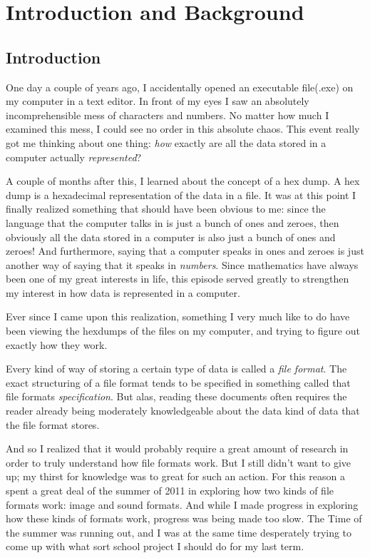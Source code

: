 \begin{comment}
  
\end{comment}

\chapter{Introduction and Background}

\section{Introduction}

One day a couple of years ago, I accidentally opened an executable
file(.exe) on my computer in a text editor. In front of my eyes I saw
an absolutely incomprehensible mess of characters and numbers. No
matter how much I examined this mess, I could see no order in this
absolute chaos. This event really got me thinking about one thing:
\textit{how} exactly are all the data stored in a computer actually
\textit{represented}?

A couple of months after this, I learned about the concept of a hex
dump. A hex dump is a hexadecimal representation of the data in a
file. It was at this point I finally realized something that should
have been obvious to me: since the language that the computer talks in
is just a bunch of ones and zeroes, then obviously all the data stored
in a computer is also just a bunch of ones and zeroes! And
furthermore, saying that a computer speaks in ones and zeroes is just
another way of saying that it speaks in \textit{numbers}. Since
mathematics have always been one of my great interests in life, this
episode served greatly to strengthen my interest in how data is
represented in a computer.

Ever since I came upon this realization, something I very much like to
do have been viewing the hexdumps of the files on my computer, and
trying to figure out exactly how they work. %

Every kind of way of storing a certain type of data is called a
\textit{file format}. The exact structuring of a file format tends to
be specified in something called that file formats
\textit{specification}. But alas, reading these documents often
requires the reader already being moderately knowledgeable about the
data kind of data that the file format stores.

And so I realized that it would probably require a great amount of
research in order to truly understand how file formats work. But I
still didn't want to give up; my thirst for knowledge was to great for
such an action.  For this reason a spent a great deal of the summer of
2011 in exploring how two kinds of file formats work: image and sound
formats. And while I made progress in exploring how these kinds of
formats work, progress was being made too slow. The Time of the summer
was running out, and I was at the same time desperately trying to come
up with what sort school project I should do for my last term.

